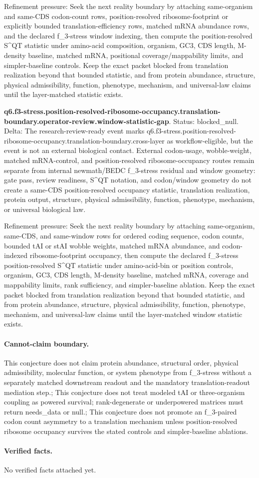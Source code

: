 Refinement pressure: Seek the next reality boundary by attaching same-organism and same-CDS codon-count rows, position-resolved ribosome-footprint or explicitly bounded translation-efficiency rows, matched mRNA abundance rows, and the declared f\_3-stress window indexing, then compute the position-resolved S\textasciicircum{}QT statistic under amino-acid composition, organism, GC3, CDS length, M-density baseline, matched mRNA, positional coverage/mappability limits, and simpler-baseline controls. Keep the exact packet blocked from translation realization beyond that bounded statistic, and from protein abundance, structure, physical admissibility, function, phenotype, mechanism, and universal-law claims until the layer-matched statistic exists.

\textbf{q6.f3-stress.position-resolved-ribosome-occupancy.translation-boundary.operator-review.window-statistic-gap}. Status: blocked\_null. Delta: The research-review-ready event marks q6.f3-stress.position-resolved-ribosome-occupancy.translation-boundary.cross-layer as workflow-eligible, but the event is not an external biological contact. External codon-usage, wobble-weight, matched mRNA-control, and position-resolved ribosome-occupancy routes remain separate from internal newmath/BEDC f\_3-stress residual and window geometry: gate pass, review readiness, S\textasciicircum{}QT notation, and codon/window geometry do not create a same-CDS position-resolved occupancy statistic, translation realization, protein output, structure, physical admissibility, function, phenotype, mechanism, or universal biological law.

Refinement pressure: Seek the next reality boundary by attaching same-organism, same-CDS, and same-window rows for ordered coding sequence, codon counts, bounded tAI or stAI wobble weights, matched mRNA abundance, and codon-indexed ribosome-footprint occupancy, then compute the declared f\_3-stress position-resolved S\textasciicircum{}QT statistic under amino-acid-bin or position controls, organism, GC3, CDS length, M-density baseline, matched mRNA, coverage and mappability limits, rank sufficiency, and simpler-baseline ablation. Keep the exact packet blocked from translation realization beyond that bounded statistic, and from protein abundance, structure, physical admissibility, function, phenotype, mechanism, and universal-law claims until the layer-matched window statistic exists.

\paragraph{Cannot-claim boundary.} This conjecture does not claim protein abundance, structural order, physical admissibility, molecular function, or system phenotype from f\_3-stress without a separately matched downstream readout and the mandatory translation-readout mediation step.; This conjecture does not treat modeled tAI or three-organism coupling as powered survival; rank-degenerate or underpowered matrices must return needs\_data or null.; This conjecture does not promote an f\_3-paired codon count asymmetry to a translation mechanism unless position-resolved ribosome occupancy survives the stated controls and simpler-baseline ablations.

\paragraph{Verified facts.}
No verified facts attached yet.
